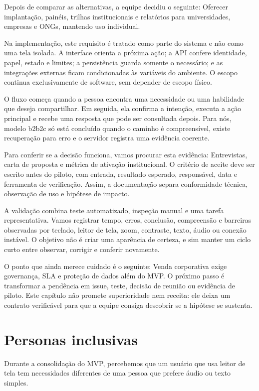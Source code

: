 \documentclass[12pt,oneside,a4paper,article]{abntex2}
\begin{document}
Depois de comparar as alternativas, a equipe decidiu o seguinte: Oferecer implantação, painéis, trilhas institucionais e relatórios para universidades, empresas e ONGs, mantendo uso individual.

Na implementação, este requisito é tratado como parte do sistema e não como uma tela isolada. A interface orienta a próxima ação; a API confere identidade, papel, estado e limites; a persistência guarda somente o necessário; e as integrações externas ficam condicionadas às variáveis do ambiente. O escopo continua exclusivamente de software, sem depender de escopo físico.

O fluxo começa quando a pessoa encontra uma necessidade ou uma habilidade que deseja compartilhar. Em seguida, ela confirma a intenção, executa a ação principal e recebe uma resposta que pode ser consultada depois. Para nós, modelo b2b2c só está concluído quando o caminho é compreensível, existe recuperação para erro e o servidor registra uma evidência coerente.

Para conferir se a decisão funciona, vamos procurar esta evidência: Entrevistas, carta de proposta e métrica de ativação institucional. O critério de aceite deve ser escrito antes do piloto, com entrada, resultado esperado, responsável, data e ferramenta de verificação. Assim, a documentação separa conformidade técnica, observação de uso e hipótese de impacto.

A validação combina teste automatizado, inspeção manual e uma tarefa representativa. Vamos registrar tempo, erros, conclusão, compreensão e barreiras observadas por teclado, leitor de tela, zoom, contraste, texto, áudio ou conexão instável. O objetivo não é criar uma aparência de certeza, e sim manter um ciclo curto entre observar, corrigir e conferir novamente.

O ponto que ainda merece cuidado é o seguinte: Venda corporativa exige governança, SLA e proteção de dados além do MVP. O próximo passo é transformar a pendência em issue, teste, decisão de reunião ou evidência de piloto. Este capítulo não promete superioridade nem receita: ele deixa um contrato verificável para que a equipe consiga descobrir se a hipótese se sustenta.

\section{Personas inclusivas}
Durante a consolidação do MVP, percebemos que um usuário que usa leitor de tela tem necessidades diferentes de uma pessoa que prefere áudio ou texto simples.
\end{document}
